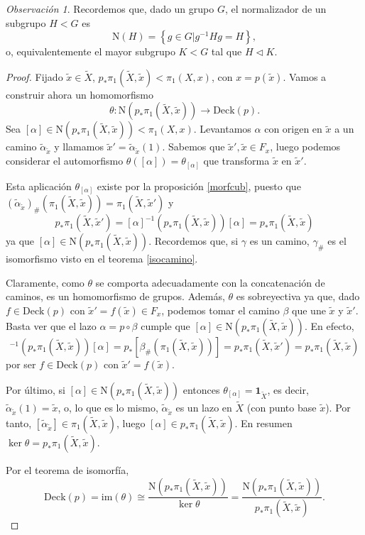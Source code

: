 \documentclass[12pt,a4paper]{book}
\theoremstyle{definition} \newtheorem{defn}[thm]{Definición}
\theoremstyle{definition} \newtheorem{ejemplo}[thm]{Ejemplo}
\theoremstyle{definition} \newtheorem{ejercicio}[thm]{Ejercicio}
\theoremstyle{remark} \newtheorem*{obs}{Observación}
\def\id{\mathbf{1}}
\def\gf{\pi_1}
\def\XX{\tilde{X}}
\def\xx{\tilde{x}}
\def\im{\mathrm{im}}
\def\DD{\mathrm{Deck}}
\def\NN{\mathrm{N}}
\begin{document}
\begin{obs}
  Recordemos que, dado un grupo $G$, el normalizador de un subgrupo $H<G$ es 
  \begin{equation*}
    \NN(H)=\left\{ g\in G| g^{-1}Hg=H \right\},
  \end{equation*}
  o, equivalentemente el mayor subgrupo $K<G$ tal que $H\lhd K$.
\end{obs}
\begin{proof}
  Fijado $\xx\in \XX$, $p_*\gf(\XX,\xx)<\gf(X,x)$, con $x=p(\xx)$. Vamos a construir ahora un homomorfismo
  \begin{equation*}
    \theta:\NN(p_{*}\gf(\XX,\xx))\rightarrow \DD(p).
  \end{equation*}
  Sea $[\alpha]\in \NN(p_*\gf(\XX,\xx))<\gf(X,x)$. Levantamos $\alpha$ con origen en $\xx$ a un camino $\tilde{\alpha}_{\xx}$ y llamamos $\xx'=\tilde{\alpha}_{\xx}(1)$. Sabemos que $\xx',\xx \in F_x$, luego podemos considerar el automorfismo $\theta([\alpha])=\theta_{[\alpha]}$ que transforma $\xx$ en $\xx'$.

  Esta aplicación $\theta_{[\alpha]}$ existe por la proposición \ref{morfcub}, puesto que $(\tilde{\alpha}_{\xx})_{\#}(\gf(\XX,\xx))=\gf(\XX,\xx')$ y 
  \begin{equation*}
    p_*\gf(\XX,\xx')=[\alpha]^{-1}(p_*\gf(\XX,\xx))[\alpha]=p_*\gf(\XX,\xx)
  \end{equation*}
  ya que $[\alpha]\in \NN(p_*\gf(\XX,\xx))$. Recordemos que, si $\gamma$ es un camino, $\gamma_\#$ es el isomorfismo visto en el teorema \ref{isocamino}.

  Claramente, como $\theta$ se comporta adecuadamente con la concatenación de caminos, es un homomorfismo de grupos. Además, $\theta$ es sobreyectiva ya que, dado $f\in \DD(p)$ con $\xx'=f(\xx)\in F_x$, podemos tomar el camino $\beta$ que une $\xx$ y $\xx'$. Basta ver que el lazo $\alpha=p\circ \beta$ cumple que $[\alpha]\in \NN(p_*\gf(\XX,\xx))$. En efecto,
  \begin{equation*}
    [\alpha]^{-1}(p_*\gf(\XX,\xx))[\alpha]=p_*[\beta_{\#}(\gf(\XX,\xx))]=p_*\gf(\XX,\xx')=p_*\gf(\XX,\xx)
  \end{equation*}
  por ser $f\in \DD(p)$ con $\xx'=f(\xx)$.

  Por último, si $[\alpha]\in \NN(p_*\gf(\XX,\xx))$ entonces $\theta_{[\alpha]}=\id_{\XX}$, es decir, $\tilde{\alpha}_{\xx}(1)=\xx$, o, lo que es lo mismo, $\tilde{\alpha}_{\xx}$ es un lazo en $\XX$ (con punto base $\xx$). Por tanto, $[\tilde{\alpha}_{\xx}]\in \gf(\XX,\xx)$, luego $[\alpha]\in p_*\gf(\XX,\xx)$. En resumen $\ker\theta=p_*\gf(\XX,\xx)$. 

  Por el teorema de isomorfía,
  \begin{equation*}
    \DD(p)=\im(\theta)\cong \frac{\NN(p_*\gf(\XX,\xx))}{\ker\theta}=\frac{\NN(p_*\gf(\XX,\xx))}{p_*\gf(\XX,\xx)}.
  \end{equation*}
\end{proof}
\end{document}
